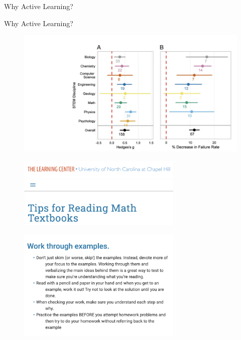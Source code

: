 \documentclass[10pt]{beamer}
\begin{document}
\begin{frame}{Why Active Learning?}
\begin{figure}[h!]
\begin{subfigure}{0.45\textwidth}
    \end{subfigure}
    
\end{figure}
	
\end{frame}




\begin{frame}{Why Active Learning?}
    \begin{figure}
        \centering
        \includegraphics[width=\textwidth]{images/active_learning} 
    \end{figure}
\end{frame}



\begin{frame}
\begin{figure}
\includegraphics[width=0.7\textwidth]{images/tips_for_reading_math}
\end{figure}
%
\begin{figure}
\includegraphics[width=0.7\textwidth]{images/work_through_examples}
\end{figure}
\end{frame}
\end{document}
